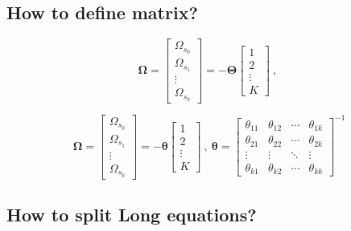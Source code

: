 \subsection{How to define matrix?}


\begin{equation}
\boldsymbol{\Omega}=\begin{bmatrix}
	\Omega_{s_0}\\
	\Omega_{s_1}\\
	\vdots\\
	\Omega_{s_k}
	\end{bmatrix} =-\mathbf{\Theta}\begin{bmatrix}
	1\\
	2\\
	\vdots\\
	K
	\end{bmatrix} \ , \
	\label{eq:10}
\end{equation}


\begin{equation}
\boldsymbol{\Omega}=\begin{bmatrix}
	\Omega_{s_0}\\
	\Omega_{s_1}\\
	\vdots\\
	\Omega_{s_k}
	\end{bmatrix} =-\mathbf{\theta}\begin{bmatrix}
	1\\
	2\\
	\vdots\\
	K
	\end{bmatrix} \ , \
    	\mathbf{\theta}=\begin{bmatrix}
	\theta_{11} & \theta_{12} & \cdots &\theta_{1k} \\
	\theta_{21} & \theta_{22} & \cdots &\theta_{2k} \\
	\vdots & \vdots & \ddots & \vdots \\
    \theta_{k1} & \theta_{k2} & \cdots &\theta_{kk}
	\end{bmatrix}^{-1}
	\label{eq:10}
\end{equation}
%
%






\subsection{How to split Long equations?}

